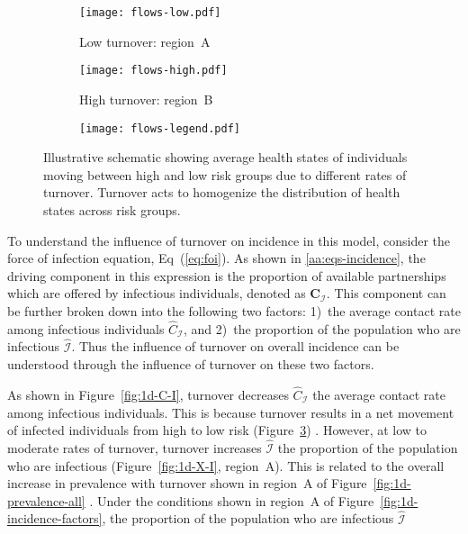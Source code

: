 \begin{figure}
  \centering
  \begin{subfigure}[t]{0.4\linewidth}
    \centering
    \texttt{[image: flows-low.pdf]}
    \caption{Low turnover: region~A}
    \label{fig:flows-low}
  \end{subfigure}%
  \begin{subfigure}[t]{0.4\linewidth}
    \centering
    \texttt{[image: flows-high.pdf]}
    \caption{High turnover: region~B}
    \label{fig:flows-high}
  \end{subfigure}%
  \begin{subfigure}[t]{0.2\linewidth}
    \centering
    \texttt{[image: flows-legend.pdf]}
  \end{subfigure}
  \caption{Illustrative schematic showing average health states of individuals
    moving between high and low risk groups due to different rates of turnover.
    Turnover acts to homogenize the distribution of health states across risk groups.}
  \label{fig:flows}
\end{figure}
\par
To understand the influence of turnover on incidence in this model,
consider the force of infection equation, Eq~(\ref{eq:foi}).
As shown in \ref{aa:eqs-incidence}, the driving component in this expression is
the proportion of available partnerships which are offered by infectious individuals,
denoted as $\bm{C}_{\mathcal{I}}$.
This component can be further broken down into the following two factors:
1)~the average contact rate among infectious individuals $\hat{C}_{\mathcal{I}}$, and
2)~the proportion of the population who are infectious $\hat{\mathcal{I}}$.
Thus the influence of turnover on overall incidence
can be understood through the influence of turnover on these two factors.
\par
As shown in Figure~\ref{fig:1d-C-I}, turnover decreases
$\hat{C}_{\mathcal{I}}$ the average contact rate among infectious individuals.
This is because turnover results in a net movement of infected individuals
from high to low risk (Figure~\ref{fig:flows}) \citep{Henry2015}.
However, at low to moderate rates of turnover, turnover increases
$\hat{\mathcal{I}}$ the proportion of the population who are infectious
(Figure~\ref{fig:1d-X-I}, region~A).
This is related to the overall increase in prevalence with turnover
shown in region~A of Figure~\ref{fig:1d-prevalence-all} \citep{Zhang2012}.
Under the conditions shown in region~A of Figure~\ref{fig:1d-incidence-factors},
the proportion of the population who are infectious $\hat{\mathcal{I}}$
